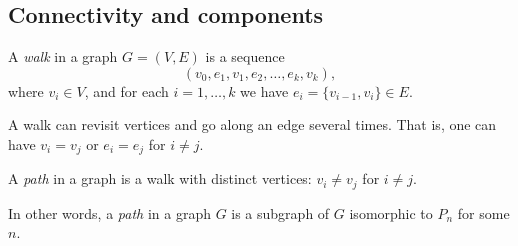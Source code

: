 \begin{page}
\setcounter{section}{1}
\setcounter{subsection}{5}
\setcounter{dfn}{13}
\label{portion:218}

\subsection{Connectivity and components}

\end{page}

\begin{page}
\setcounter{section}{1}
\setcounter{subsection}{5}
\setcounter{dfn}{14}
\label{portion:220}

\begin{dfn}
A \emph{walk} in a graph $G = (V, E)$ is a sequence
\[
(v_0, e_1, v_1, e_2, \ldots, e_k, v_k),
\]
where $v_i \in V$, and for each $i = 1, \ldots, k$ we have $e_i = \{v_{i-1}, v_i\} \in E$.
\end{dfn}

\end{page}

\begin{page}
\setcounter{section}{1}
\setcounter{subsection}{5}
\setcounter{dfn}{15}
\label{portion:223}

\begin{rem}
A walk can revisit vertices and go along an edge several times.
That is, one can have $v_i = v_j$ or $e_i = e_j$ for $i \ne j$.
\end{rem}

\end{page}

\begin{page}
\setcounter{section}{1}
\setcounter{subsection}{5}
\setcounter{dfn}{16}
\label{portion:226}

\begin{dfn}
\label{dfn:PathCycle}
A \emph{path} in a graph is a walk with distinct vertices: $v_i \ne v_j$ for $i \ne j$.
\end{dfn}

\end{page}

\begin{page}
\setcounter{section}{1}
\setcounter{subsection}{5}
\setcounter{dfn}{16}
\label{portion:227}

In other words, a \emph{path} in a graph $G$ is a subgraph of $G$ isomorphic to $P_n$ for some $n$.


\end{page}

